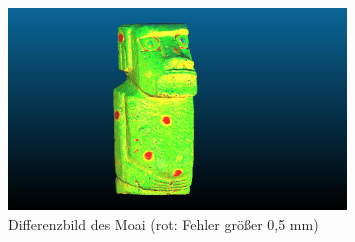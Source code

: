 \documentclass[./00PhotoBox.tex]{subfiles}
\begin{document}
\begin{figure}
    \centering
    \includegraphics[width=0.8\textwidth]{img/moai_fehler_drehteller.jpg}
    \caption{Differenzbild des Moai (rot: Fehler größer 0,5 mm)}
    \label{img:drehteller_moai_fehler}
\end{figure}

\biblio
\end{document}
